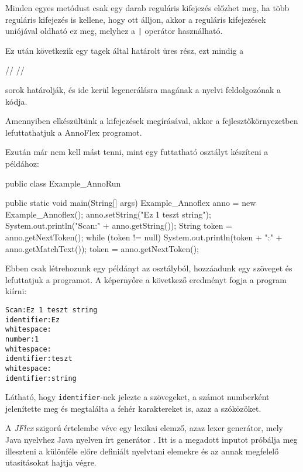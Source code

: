 Minden egyes metódust csak egy darab reguláris kifejezés előzhet meg, ha több reguláris kifejezés is kellene, hogy ott álljon, akkor a reguláris kifejezések uniójával oldható ez meg, melyhez a \texttt{|} operátor használható.

Ez után következik egy tagek által határolt üres rész, ezt mindig a
\begin{java}
//%
//%
\end{java}
sorok határolják, és ide kerül legenerálásra magának a nyelvi feldolgozónak a kódja.

Amennyiben elkészültünk a kifejezések megírásával, akkor a fejlesztőkörnyezetben lefuttathatjuk a AnnoFlex programot.



Ezután már nem kell mást tenni, mint egy futtatható osztályt készíteni a példához:

\begin{java}
public class Example_AnnoRun {

	public static void main(String[] args) {
		Example_Annoflex anno = new Example_Annoflex();
		anno.setString("Ez 1 teszt string");
		System.out.println("Scan:" + anno.getString());
		String token = anno.getNextToken();
		while (token != null) {
			System.out.println(token + ":" + anno.getMatchText());
			token = anno.getNextToken();
		}
	}

}
\end{java}

Ebben csak létrehozunk egy példányt az osztályból, hozzáadunk egy szöveget és lefuttatjuk a programot. A képernyőre a következő eredményt fogja a program kiírni:

\begin{verbatim}
Scan:Ez 1 teszt string
identifier:Ez
whitespace: 
number:1
whitespace: 
identifier:teszt
whitespace: 
identifier:string
\end{verbatim}

Látható, hogy \texttt{identifier}-nek jelezte a szövegeket, a számot numberként jelenítette meg és megtalálta a fehér karaktereket is, azaz a szóközöket.


A \textit{JFlex} szigorú értelembe véve egy lexikai elemző, azaz lexer generátor, mely Java nyelvhez Java nyelven írt generátor \cite{jflex}. Itt is a megadott inputot próbálja meg illeszteni a különféle előre definiált nyelvtani elemekre és az annak megfelelő utasításokat hajtja végre.

